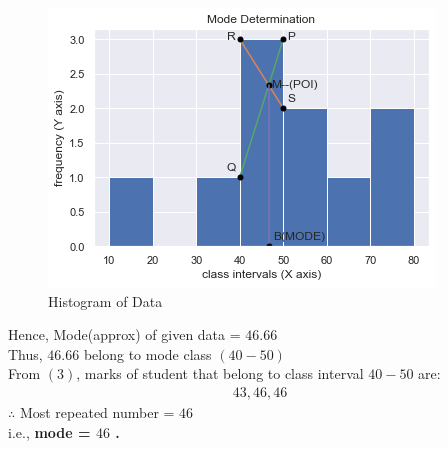 \documentclass[journal,12pt,twocolumn]{IEEEtran}
\begin{document}
\begin{flushleft}
\begin{enumerate}
	\begin{figure}[H]
		\centering
			\includegraphics[width=\columnwidth]{figs/graph.png}
			\caption{Histogram of Data}		
	\end{figure}	
Hence, Mode(approx) of given data = $46.66$\\[8pt]
Thus, $46.66$ belong to mode class $(40-50)$\\[5pt]
From $(3)$, marks of student that belong to class interval $40-50$ are:
	\begin{align*}
		43,46,46
	\end{align*}
$\therefore$ Most repeated number = $46$\\[8pt]
i.e., \textbf{mode = $46$ .}\\
\end{enumerate}
\end{flushleft}
\end{document}

